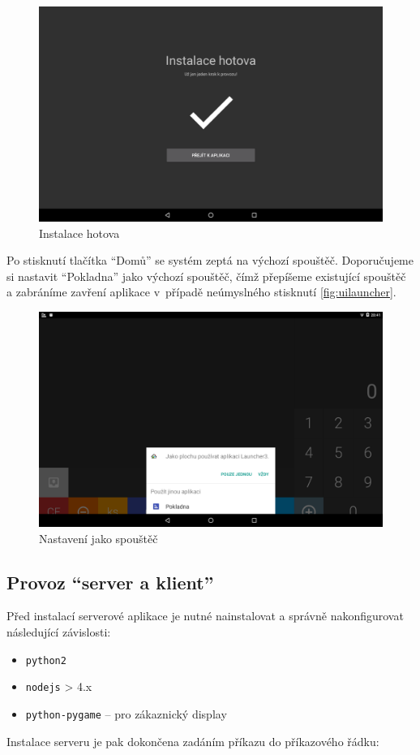 \documentclass[a4paper,11pt,oneside]{article}
\begin{document}
\begin{figure}[H]
	\centering
	\includegraphics[width=0.6\linewidth]{../navod_finish}
	\caption{Instalace hotova}
	\label{fig:navodfinish}
\end{figure}

Po stisknutí tlačítka \enquote{Domů} se systém zeptá na výchozí spouštěč. Doporučujeme si nastavit \enquote{Pokladna} jako výchozí spouštěč, čímž přepíšeme existující spouštěč a zabráníme zavření aplikace v~případě neúmyslného stisknutí \eqref{fig:uilauncher}.

\begin{figure}[H]
	\centering
	\includegraphics[width=0.6\linewidth]{../ui_launcher}
	\caption{Nastavení jako spouštěč}
	\label{fig:uilauncher}
\end{figure}

\subsection{Provoz \enquote{server a klient}}
Před instalací serverové aplikace je nutné nainstalovat a správně nakonfigurovat následující závislosti:

\begin{itemize}
	\item \lstinline|python2|
	\item \lstinline|nodejs| > 4.x
	\item \lstinline|python-pygame| -- pro zákaznický display
\end{itemize}
Instalace serveru je pak dokončena zadáním příkazu do příkazového řádku:
\end{document}
